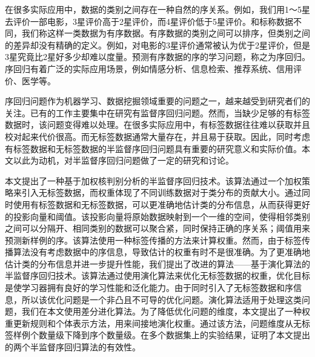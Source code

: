 ﻿
\begin{cnabstract}

在很多实际应用中，数据的类别之间存在一种自然的序关系。例如，我们用1～5星去评价一部电影，3星评价高于2星评价，而4星评价低于5星评价。和标称数据不同，我们称这样一类数据为有序数据。有序数据的类别之间可以排序，但类别之间的差异却没有精确的定义。例如，对电影的3星评价通常被认为优于2星评价，但是3星究竟比2星好多少却难以度量。预测有序数据的序的学习问题，称之为序回归。序回归有着广泛的实际应用场景，例如情感分析、信息检索、推荐系统、信用评价、医学等。

序回归问题作为机器学习、数据挖掘领域重要的问题之一，越来越受到研究者们的关注。已有的工作主要集中在研究有监督序回归问题。然而，当缺少足够的有标签数据时，该问题变得难以处理。在很多实际应用中，有标签数据往往难以获取并且校对起来代价很高。而无标签数据通常大量存在，并且易于获取。因此，同时考虑有标签数据和无标签数据的半监督序回归问题具有重要的研究意义和实际价值。本文以此为动机，对半监督序回归问题做了一定的研究和讨论。

本文提出了一种基于加权核判别分析的半监督序回归技术。该算法通过一个加权策略来引入无标签数据，而权重体现了不同训练数据对于类分布的贡献大小。通过同时使用有标签数据和无标签数据，可以更准确地估计类的分布信息，从而获得更好的投影向量和阈值。该投影向量将原始数据映射到一个一维的空间，使得相邻类别之间可以分隔开、相同类别的数据可以聚合紧，同时保持正确的序关系；阈值用来预测新样例的序。该算法使用一种标签传播的方法来计算权重。然而，由于标签传播算法没有考虑数据中的序信息，导致估计的权重有时不是很准确。为了更准确地估计类的分布信息并进一步提升性能，我们提出了改进的算法——基于演化算法的半监督序回归技术。该算法通过使用演化算法来优化无标签数据的权重，优化目标是使学习器拥有良好的学习性能和泛化能力。由于同时引入了无标签数据和序信息，所以该优化问题是一个非凸且不可导的优化问题。演化算法适用于处理这类问题，我们在本文使用差分进化算法。为了降低优化问题的维度，本文提出了一种权重更新规则和个体表示方法，用来间接地演化权重。通过该方法，问题维度从无标签样例个数量级下降到序个数量级。在多个数据集上的实验结果，证明了本文提出的两个半监督序回归算法的有效性。


\end{cnabstract}


